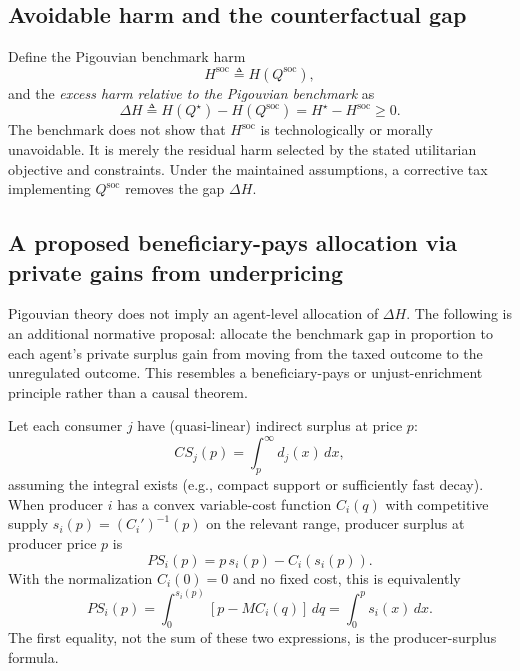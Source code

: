 \documentclass[journal, a4paper]{IEEEtran}
\begin{document}
\subsection{Avoidable harm and the counterfactual gap}
Define the Pigouvian benchmark harm
\begin{equation}
H^{\text{soc}} \triangleq H(Q^{\text{soc}}),
\end{equation}
and the \emph{excess harm relative to the Pigouvian benchmark} as
\begin{equation}
\Delta H \triangleq H(Q^\star)-H(Q^{\text{soc}})=H^\star-H^{\text{soc}} \ge 0.
\label{eq:deltaH}
\end{equation}
The benchmark does not show that $H^{\text{soc}}$ is technologically or morally unavoidable. It is merely the residual harm selected by the stated utilitarian objective and constraints. Under the maintained assumptions, a corrective tax implementing $Q^{\text{soc}}$ removes the gap $\Delta H$.

\subsection{A proposed beneficiary-pays allocation via private gains from underpricing}
Pigouvian theory does not imply an agent-level allocation of $\Delta H$. The following is an additional normative proposal: allocate the benchmark gap in proportion to each agent's private surplus gain from moving from the taxed outcome to the unregulated outcome. This resembles a beneficiary-pays or unjust-enrichment principle rather than a causal theorem.

Let each consumer $j$ have (quasi-linear) indirect surplus at price $p$:
\begin{equation}
CS_j(p)=\int_{p}^{\infty} d_j(x)\,dx,
\label{eq:cs}
\end{equation}
assuming the integral exists (e.g., compact support or sufficiently fast decay). When producer $i$ has a convex variable-cost function $C_i(q)$ with competitive supply $s_i(p)=(C_i')^{-1}(p)$ on the relevant range, producer surplus at producer price $p$ is
\begin{equation}
PS_i(p)=p\,s_i(p)-C_i(s_i(p)).
\label{eq:pscost}
\end{equation}
With the normalization $C_i(0)=0$ and no fixed cost, this is equivalently
\begin{equation}
PS_i(p)=\int_0^{s_i(p)}[p-MC_i(q)]\,dq
=\int_0^p s_i(x)\,dx.
\end{equation}
The first equality, not the sum of these two expressions, is the producer-surplus formula.
\end{document}
